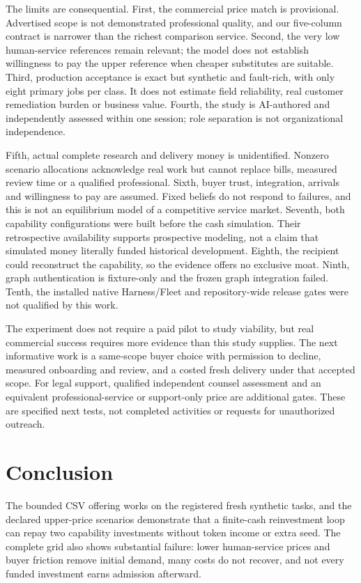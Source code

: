 \documentclass[11pt,letterpaper]{article}
\begin{document}
The limits are consequential. First, the commercial price match is provisional. Advertised scope is not demonstrated professional quality, and our five-column contract is narrower than the richest comparison service. Second, the very low human-service references remain relevant; the model does not establish willingness to pay the upper reference when cheaper substitutes are suitable. Third, production acceptance is exact but synthetic and fault-rich, with only eight primary jobs per class. It does not estimate field reliability, real customer remediation burden or business value. Fourth, the study is AI-authored and independently assessed within one session; role separation is not organizational independence.

Fifth, actual complete research and delivery money is unidentified. Nonzero scenario allocations acknowledge real work but cannot replace bills, measured review time or a qualified professional. Sixth, buyer trust, integration, arrivals and willingness to pay are assumed. Fixed beliefs do not respond to failures, and this is not an equilibrium model of a competitive service market. Seventh, both capability configurations were built before the cash simulation. Their retrospective availability supports prospective modeling, not a claim that simulated money literally funded historical development. Eighth, the recipient could reconstruct the capability, so the evidence offers no exclusive moat. Ninth, graph authentication is fixture-only and the frozen graph integration failed. Tenth, the installed native Harness/Fleet and repository-wide release gates were not qualified by this work.

The experiment does not require a paid pilot to study viability, but real commercial success requires more evidence than this study supplies. The next informative work is a same-scope buyer choice with permission to decline, measured onboarding and review, and a costed fresh delivery under that accepted scope. For legal support, qualified independent counsel assessment and an equivalent professional-service or support-only price are additional gates. These are specified next tests, not completed activities or requests for unauthorized outreach.

\section{Conclusion}
The bounded CSV offering works on the registered fresh synthetic tasks, and the declared upper-price scenarios demonstrate that a finite-cash reinvestment loop can repay two capability investments without token income or extra seed. The complete grid also shows substantial failure: lower human-service prices and buyer friction remove initial demand, many costs do not recover, and not every funded investment earns admission afterward.
\end{document}
